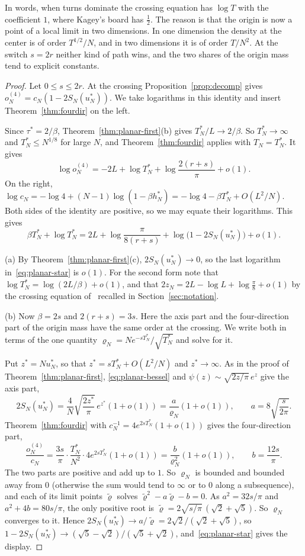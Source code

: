 In words, when turns dominate the crossing equation has $\log T$ with the coefficient $1$, where
Kagey's board has $\frac12$. The reason is that the origin is now a point of a local limit in two
dimensions. In one dimension the density at the center is of order $T^{1/2}/N$, and in two
dimensions it is of order $T/N^2$. At the switch $s=2r$ neither kind of path wins, and the two
shares of the origin mass tend to explicit constants.

\begin{proof}
Let $0\le s\le2r$. At the crossing Proposition~\ref{prop:decomp} gives
$o^{(4)}_N=c_N(1-2S_N(u^*_N))$. We take logarithms in this identity and insert
Theorem~\ref{thm:fourdir} on the left.

Since $\tau^*=2/\beta$, Theorem~\ref{thm:planar-first}(b) gives $T^*_N/L\to2/\beta$. So
$T^*_N\to\infty$ and $T^*_N\le N^{1/8}$ for large $N$, and Theorem~\ref{thm:fourdir} applies with
$T_N=T^*_N$. It gives
\[
 \log o^{(4)}_N=-2L+\log T^*_N+\log\frac{2(r+s)}\pi+o(1).
\]
On the right, $\log c_N=-\log4+(N-1)\log(1-\beta h^*_N)=-\log4-\beta T^*_N+O(L^2/N)$. Both sides of
the identity are positive, so we may equate their logarithms. This gives
\begin{equation}\label{eq:planar-star}
 \beta T^*_N+\log T^*_N=2L+\log\frac\pi{8(r+s)}+\log\bigl(1-2S_N(u^*_N)\bigr)+o(1).
\end{equation}

(a) By Theorem~\ref{thm:planar-first}(c), $2S_N(u^*_N)\to0$, so the last logarithm
in~\eqref{eq:planar-star} is $o(1)$. For the second form note that
$\log T^*_N=\log(2L/\beta)+o(1)$, and that $2z_N=2L-\log L+\log\frac\pi8+o(1)$ by the crossing
equation of~\cite{paperA} recalled in Section~\ref{sec:notation}.

(b) Now $\beta=2s$ and $2(r+s)=3s$. Here the axis part and the four-direction part of the origin
mass have the same order at the crossing. We write both in terms of the one quantity
$\varrho_N=Ne^{-sT^*_N}/\sqrt{T^*_N}$ and solve for it.

Put $z^*=Nu^*_N$, so that $z^*=sT^*_N+O(L^2/N)$ and $z^*\to\infty$. As in the proof of
Theorem~\ref{thm:planar-first}, \eqref{eq:planar-bessel} and $\psi(z)\sim\sqrt{2z/\pi}\,e^z$ give
the axis part,
\[
 2S_N(u^*_N)=\frac4N\sqrt{\frac{2z^*}\pi}\,e^{z^*}(1+o(1))=\frac a{\varrho_N}(1+o(1)),
 \qquad a=8\sqrt{\frac s{2\pi}}.
\]
Theorem~\ref{thm:fourdir} with $c_N^{-1}=4e^{2sT^*_N}(1+o(1))$ gives the four-direction part,
\[
 \frac{o^{(4)}_N}{c_N}=\frac{3s}\pi\cdot\frac{T^*_N}{N^2}\cdot4e^{2sT^*_N}(1+o(1))
 =\frac b{\varrho_N^2}(1+o(1)),\qquad b=\frac{12s}\pi.
\]
The two parts are positive and add up to $1$. So $\varrho_N$ is bounded and bounded away from $0$
(otherwise the sum would tend to $\infty$ or to $0$ along a subsequence), and each of its limit
points $\tilde\varrho$ solves $\tilde\varrho^2-a\tilde\varrho-b=0$. As $a^2=32s/\pi$ and
$a^2+4b=80s/\pi$, the only positive root is $\tilde\varrho=2\sqrt{s/\pi}\,(\sqrt2+\sqrt5)$. So
$\varrho_N$ converges to it. Hence
$2S_N(u^*_N)\to a/\tilde\varrho=2\sqrt2/(\sqrt2+\sqrt5)$, so
$1-2S_N(u^*_N)\to(\sqrt5-\sqrt2)/(\sqrt5+\sqrt2)$, and~\eqref{eq:planar-star} gives the display.
\end{proof}


